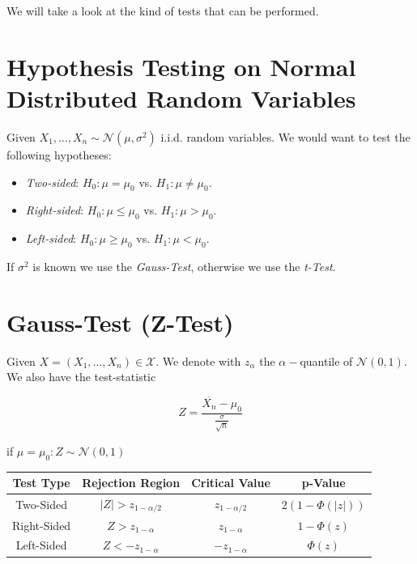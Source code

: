We will take a look at the kind of tests that can be performed. 

\section{Hypothesis Testing on Normal Distributed Random Variables}

Given \(X_1, \dots, X_n \sim \mathcal{N}(\mu, \sigma^2)\) i.i.d. random variables. We would 
want to test the following hypotheses:  

\begin{itemize}

    \item \emph{Two-sided}: \(H_0: \mu = \mu_0\) vs. \(H_1: \mu \ne \mu_0\).

    \item \emph{Right-sided}: \(H_0: \mu \le \mu_0\) vs. \(H_1: \mu > \mu_0\).

    \item \emph{Left-sided}: \(H_0: \mu \ge \mu_0\) vs. \(H_1: \mu < \mu_0\).

\end{itemize}

If \(\sigma^2\) is known we use the \emph{Gauss-Test}, otherwise we use the \emph{t-Test}. 

\section{Gauss-Test (Z-Test)}

Given \(X = (X_1, \dots, X_n) \in \mathcal{X}\). We denote with \(z_\alpha\) the \(\alpha-\)quantile of \(\mathcal{N}(0,1)\). 
We also have the test-statistic 

\[
    Z = \frac{\overline{X_n} - \mu_0}{ \frac{\sigma}{\sqrt{n}}}
\]

if \(\mu = \mu_0: Z \sim \mathcal{N}(0,1)\)

\begin{table}[h!]
    \centering
    \begin{tabular}{c|c|c|c}
        Test Type & Rejection Region & Critical Value & p-Value \\ \hline
        Two-Sided & \(|Z| > z_{1 - \alpha/2}\) & \(z_{1 - \alpha/2}\) & \(2(1 - \Phi(|z|))\) \\ \hline
        Right-Sided & \(Z > z_{1 - \alpha}\) & \(z_{1 - \alpha}\) & \(1 - \Phi(z)\) \\ \hline
        Left-Sided & \(Z < -z_{1 - \alpha}\) & \(-z_{1 - \alpha}\) & \(\Phi(z)\)
    \end{tabular}
\end{table}

